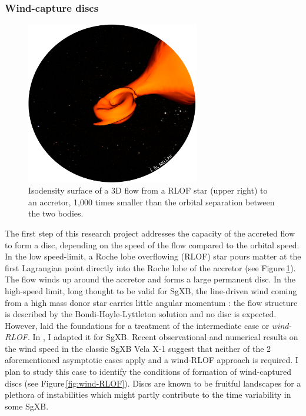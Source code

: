 \documentclass[a4paper,12pt,onecolumn]{article}
\makeatletter
\newcommand{\sgx}{SgXB\xspace}
\newcommand*{\rlof}{RLOF\@\xspace}
\makeatother
\begin{document}
\newpage

\subsubsection*{Wind-capture discs}

\begin{figure}
\vspace*{-1.5cm}
\hspace*{0.1cm}
\includegraphics[height=7.1cm]{Figures/RLOF.png}
\caption{Isodensity surface of a 3D flow from a \rlof star (upper right) to an accretor, 1,000 times smaller than the orbital separation between the two bodies.}
\label{fig:bow2.5d}
\end{figure} 

The first step of this research project addresses the capacity of the accreted flow to form a disc, depending on the speed of the flow compared to the orbital speed. In the low speed-limit, a Roche lobe overflowing (\rlof) star pours matter at the first Lagrangian point directly into the Roche lobe of the accretor (see Figure\,\ref{fig:bow2.5d}). The flow winds up around the accretor and forms a large permanent disc. In the high-speed limit, long thought to be valid for \sgx, the line-driven wind coming from a high mass donor star carries little angular momentum : the flow structure is described by the Bondi-Hoyle-Lyttleton solution and no disc is expected. However, \cite{Mohamed2011} laid the foundations for a treatment of the intermediate case or \textit{wind-RLOF}. In \cite{ElMellah2016a}, I adapted it for \sgx. Recent observational and numerical results on the wind speed in the classic \sgx Vela X-1 suggest that neither of the 2 aforementioned asymptotic cases apply \citep{Gimenez-Garcia2016,Sander2017} and a wind-RLOF approach is required. I plan to study this case to identify the conditions of formation of wind-captured discs (see Figure\,\ref{fig:wind-RLOF}). Discs are known to be fruitful landscapes for a plethora of instabilities which might partly contribute to the time variability in some \sgx.\\ \\
\end{document}
